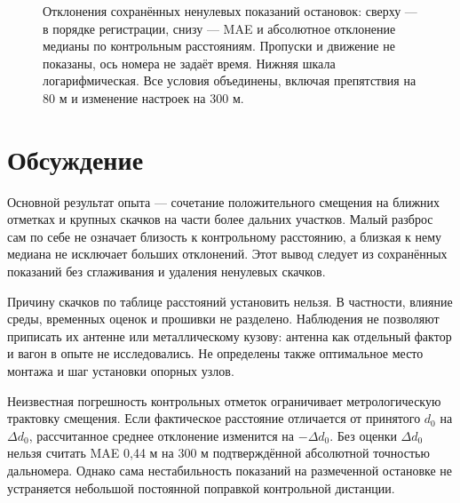 \documentclass{misisarticle}
\begin{document}
\begin{figure}[!t]
\caption{Отклонения сохранённых ненулевых показаний остановок: сверху --- в порядке регистрации, снизу --- MAE и абсолютное отклонение медианы по контрольным расстояниям. Пропуски и движение не показаны, ось номера не задаёт время. Нижняя шкала логарифмическая. Все условия объединены, включая препятствия на 80 м и изменение настроек на 300 м.}
\label{fig:errors}
\end{figure}

\FloatBarrier

\section{Обсуждение}

Основной результат опыта --- сочетание положительного смещения на ближних отметках и крупных скачков на части более дальних участков. Малый разброс сам по себе не означает близость к контрольному расстоянию, а близкая к нему медиана не исключает больших отклонений. Этот вывод следует из сохранённых показаний без сглаживания и удаления ненулевых скачков.

Причину скачков по таблице расстояний установить нельзя. В частности, влияние среды, временных оценок и прошивки не разделено. Наблюдения не позволяют приписать их антенне или металлическому кузову: антенна как отдельный фактор и вагон в опыте не исследовались. Не определены также оптимальное место монтажа и шаг установки опорных узлов.

Неизвестная погрешность контрольных отметок ограничивает метрологическую трактовку смещения. Если фактическое расстояние отличается от принятого $d_0$ на $\Delta d_0$, рассчитанное среднее отклонение изменится на $-\Delta d_0$. Без оценки $\Delta d_0$ нельзя считать MAE 0,44 м на 300 м подтверждённой абсолютной точностью дальномера. Однако сама нестабильность показаний на размеченной остановке не устраняется небольшой постоянной поправкой контрольной дистанции.
\end{document}
